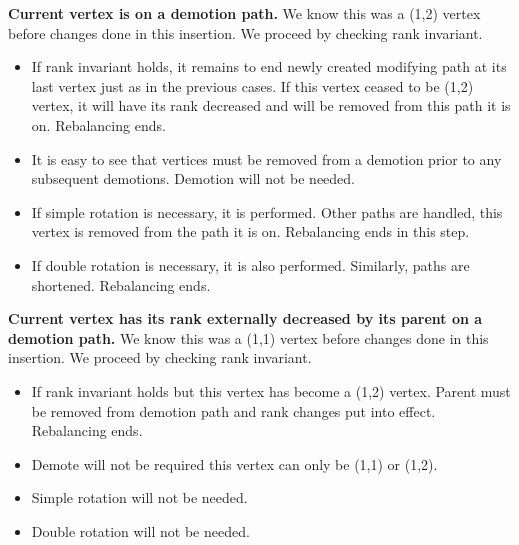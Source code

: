 \textbf{Current vertex is on a demotion path.} We know this was a (1,2) vertex before changes done in this insertion. We proceed by checking rank invariant. 

\begin{itemize}

\item If rank invariant holds, it remains to end newly created modifying path at its last vertex just as in the previous cases. If this vertex ceased to be (1,2) vertex, it will have its rank decreased and will be removed from this path it is on. Rebalancing ends.

\item It is easy to see that vertices must be removed from a demotion prior to any subsequent demotions. Demotion will not be needed.

\item If simple rotation is necessary, it is performed. Other paths are handled, this vertex is removed from the path it is on. Rebalancing ends in this step.

\item If double rotation is necessary, it is also performed. Similarly, paths are shortened. Rebalancing ends.

\end{itemize}

\textbf{Current vertex has its rank externally decreased by its parent on a demotion path.} We know this was a (1,1) vertex before changes done in this insertion. We proceed by checking rank invariant. 

\begin{itemize}

\item If rank invariant holds but this vertex has become a (1,2) vertex. Parent must be removed from demotion path and rank changes put into effect. Rebalancing ends.

\item Demote will not be required this vertex can only be (1,1) or (1,2).

\item Simple rotation will not be needed.

\item Double rotation will not be needed.

\end{itemize}
